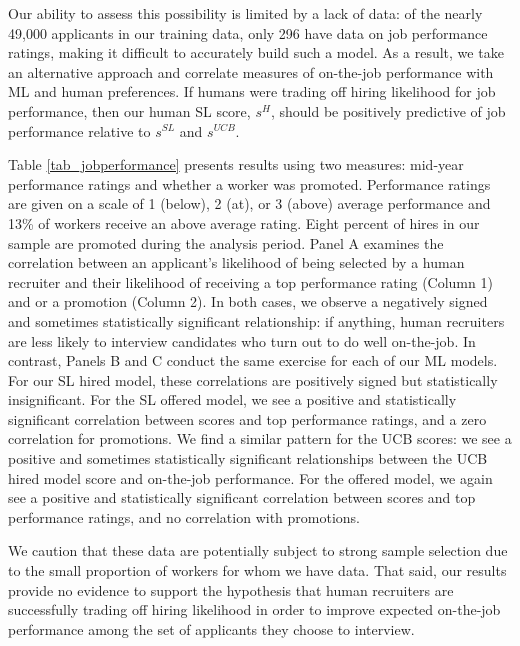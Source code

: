 \documentclass[crop,noquery,editorname,historyrev,nosurname,runningno,sepcount]{RESTUD}
\begin{document}
Our ability to assess this possibility is limited by a lack of data: of the nearly 49,000 applicants in our training data, only 296 have data on job performance ratings, making it difficult to accurately build such a model.  As a result, we take an alternative approach and correlate measures of on-the-job performance with ML and human preferences.  If humans were trading off hiring likelihood for job performance, then our human SL score, $s^H$, should be positively predictive of job performance relative to $s^{SL}$ and $s^{UCB}$.

Table \ref{tab_jobperformance} presents results using two measures: mid-year performance ratings and whether a worker was promoted.  Performance ratings are given on a scale of 1 (below), 2 (at), or 3 (above) average performance and 13\% of workers receive an above average rating.  Eight percent of hires in our sample are promoted during the analysis period. 
Panel A examines the correlation between an applicant's likelihood of being selected by a human recruiter and their likelihood of receiving a top performance rating (Column 1) and or a promotion (Column 2).  In both cases, we observe a negatively signed and sometimes statistically significant relationship: if anything, human recruiters are less likely to interview candidates who turn out to do well on-the-job.  In contrast, Panels B and C conduct the same exercise for each of our ML models.  For our SL hired model, these correlations are positively signed but statistically insignificant.  For the SL offered model, we see a positive and statistically significant correlation between scores and top performance ratings, and a zero correlation for promotions. We find a similar pattern for the UCB scores: we see a positive and sometimes statistically significant relationships between the UCB hired model score and on-the-job performance.   For the offered model, we again see a positive and statistically significant correlation between scores and top performance ratings, and no  correlation with promotions.

We caution that these data are potentially subject to strong sample selection due to the small proportion of workers for whom we have data.  That said, our results provide no evidence to support the hypothesis that human recruiters are successfully trading off hiring likelihood in order to improve expected on-the-job performance among the set of applicants they choose to interview.  
\end{document}
